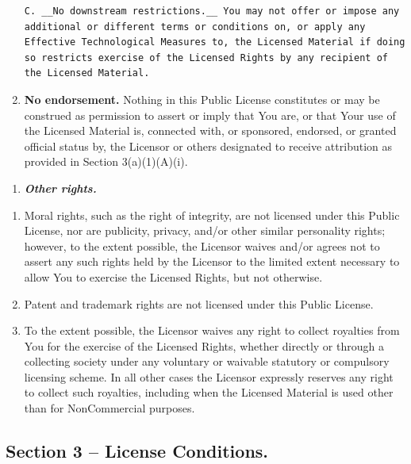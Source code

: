 \documentclass[]{book}
\providecommand{\tightlist}{%
  \setlength{\itemsep}{0pt}\setlength{\parskip}{0pt}}
\begin{document}
\begin{enumerate}
\begin{verbatim}
C. __No downstream restrictions.__ You may not offer or impose any additional or different terms or conditions on, or apply any Effective Technological Measures to, the Licensed Material if doing so restricts exercise of the Licensed Rights by any recipient of the Licensed Material.
\end{verbatim}
\item
  \textbf{No endorsement.} Nothing in this Public License constitutes or
  may be construed as permission to assert or imply that You are, or
  that Your use of the Licensed Material is, connected with, or
  sponsored, endorsed, or granted official status by, the Licensor or
  others designated to receive attribution as provided in Section
  3(a)(1)(A)(i).
\end{enumerate}

\begin{enumerate}
\def\labelenumi{\alph{enumi}.}
\setcounter{enumi}{1}
\tightlist
\item
  \textbf{\emph{Other rights.}}
\end{enumerate}

\begin{enumerate}
\def\labelenumi{\arabic{enumi}.}
\item
  Moral rights, such as the right of integrity, are not licensed under
  this Public License, nor are publicity, privacy, and/or other similar
  personality rights; however, to the extent possible, the Licensor
  waives and/or agrees not to assert any such rights held by the
  Licensor to the limited extent necessary to allow You to exercise the
  Licensed Rights, but not otherwise.
\item
  Patent and trademark rights are not licensed under this Public
  License.
\item
  To the extent possible, the Licensor waives any right to collect
  royalties from You for the exercise of the Licensed Rights, whether
  directly or through a collecting society under any voluntary or
  waivable statutory or compulsory licensing scheme. In all other cases
  the Licensor expressly reserves any right to collect such royalties,
  including when the Licensed Material is used other than for
  NonCommercial purposes.
\end{enumerate}

\subsection{Section 3 -- License
Conditions.}\label{section-3-license-conditions.}
\end{document}

